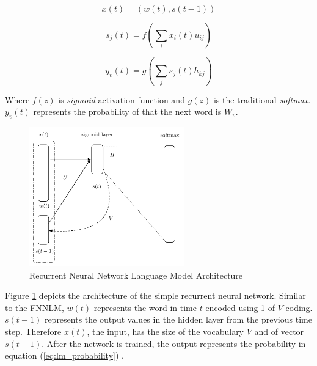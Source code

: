 \begin{equation} x(t) = (w(t), s(t-1))  \end{equation} 

\begin{equation} s_j(t) = f \left( \sum_{i}{x_i(t)u_{ij}}
  \right)   \end{equation}

\begin{equation}  y_v(t) = g \left( \sum_{j}{s_j(t)h_{kj}}
  \right)   \end{equation}


Where   $f(z)$ is \textit{sigmoid} activation function and $g(z)$  is the
traditional   \textit{softmax}.  $y_v(t)$ represents the probability of that
the next word is $W_v$.


\begin{figure}[hptb!]
    \centering
    \includegraphics[width=0.6\textwidth]{images/mikolov-rnnlm.pdf} 
    \caption{Recurrent Neural Network Language Model Architecture}
    \label{fig:RNNLM_architecture}
\end{figure}



Figure \ref{fig:RNNLM_architecture} depicts the architecture of the simple
recurrent neural network. Similar to the \ac{FNNLM},    $w(t)$ represents the word in time $t$ encoded using 1-of-$V$ coding.  $s(t-1)$ represents the output values in the
hidden layer from the previous time step. Therefore $x(t)$, the input, has
the size of the vocabulary $V$ and of vector $s(t-1)$. After the network is
trained, the output represents the probability  in  equation
(\ref{eq:lm_probability})  \cite{mikolovphd2012}. %


